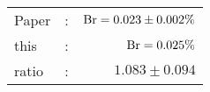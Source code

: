       \begin{tabular}{lcr}
          Paper &:& $\mathrm{Br}  = 0.023\pm 0.002\%$ \\
          this      &:& $\mathrm{Br}  = 0.025\%$ \\
		  ratio   &:& $1.083\pm 0.094$ \\
      \end{tabular}
